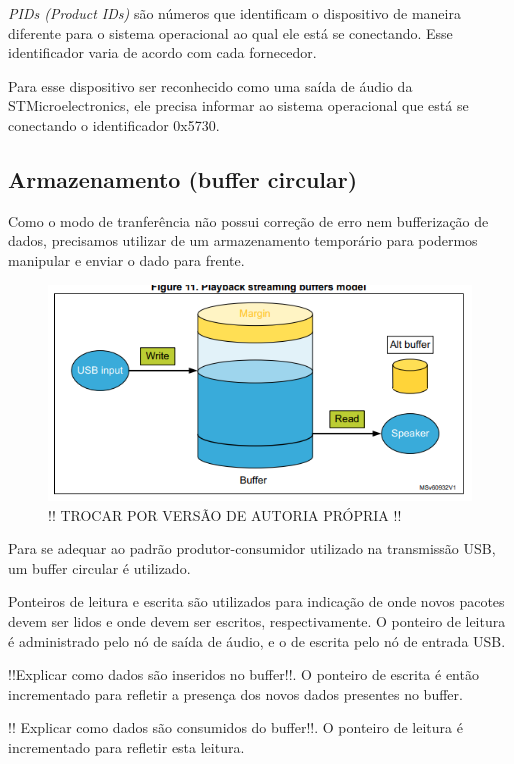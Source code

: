 \textit{PIDs (Product IDs)} são números que identificam o dispositivo de maneira diferente para o sistema operacional ao qual ele está se conectando. Esse identificador varia de acordo com cada fornecedor.

Para esse dispositivo ser reconhecido como uma saída de áudio da STMicroelectronics, ele precisa informar ao sistema operacional que está se conectando o identificador 0x5730.

\subsection{Armazenamento (buffer circular)}
Como o modo de tranferência não possui correção de erro nem bufferização de dados, precisamos utilizar de um armazenamento temporário para podermos manipular e enviar o dado para frente.
\begin{figure}[!h]
  \includegraphics[scale=0.5]{figuras/circular-buffer.png}
  \caption{!! TROCAR POR VERSÃO DE AUTORIA PRÓPRIA !!}
  \label{fig:circularBuffer}
\end{figure}

Para se adequar ao padrão produtor-consumidor utilizado na transmissão USB, um buffer circular é utilizado. 

Ponteiros de leitura e escrita são utilizados para indicação de onde novos pacotes devem ser lidos e onde devem ser escritos, respectivamente. O ponteiro de leitura é administrado pelo nó de saída de áudio, e o de escrita pelo nó de entrada USB.

!!Explicar como dados são inseridos no buffer!!. O ponteiro de escrita é então incrementado para refletir a presença dos novos dados presentes no buffer.

!! Explicar como dados são consumidos do buffer!!. O ponteiro de leitura é incrementado para refletir esta leitura.

